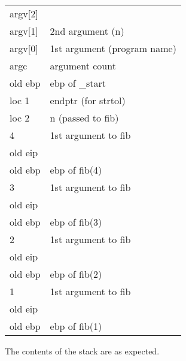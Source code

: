\documentclass[12pt,a4paper]{article}
\begin{document}
\begin{tabularx}{\textwidth}{XX}
argv[2] &                              \\
argv[1] &  2nd argument (n)            \\
argv[0] &  1st argument (program name) \\
argc    &  argument count              \\
old ebp &  ebp of \_start              \\
loc 1   &  endptr (for strtol)         \\
loc 2   &  n (passed to fib)           \\
4       &  1st argument to fib         \\
old eip &                              \\
old ebp &  ebp of fib(4)               \\
3       &  1st argument to fib         \\
old eip &                              \\
old ebp &  ebp of fib(3)               \\
2       &  1st argument to fib         \\
old eip &                              \\
old ebp &  ebp of fib(2)               \\
1       &  1st argument to fib         \\
old eip &                              \\
old ebp &  ebp of fib(1)               \\
\end{tabularx}

The contents of the stack are as expected.
\end{document}
